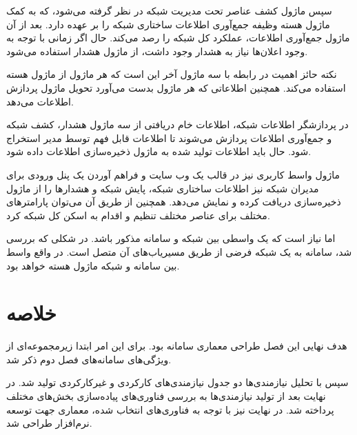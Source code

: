 سپس ماژول کشف عناصر تحت مدیریت شبکه در نظر گرفته می‌شود، که به کمک ماژول هسته وظیفه جمع‌آوری اطلاعات ساختاری شبکه را بر عهده دارد. بعد از آن ماژول جمع‌آوری اطلاعات، عملکرد کل شبکه را رصد می‌کند. حال اگر زمانی با توجه به وجود اعلان‌ها نیاز به هشدار وجود داشت، از ماژول هشدار استفاده می‌شود. 

\newpage

نکته حائز اهمیت در رابطه با سه ماژول آخر این است که هر ماژول از ماژول هسته استفاده می‌کند. همچنین اطلاعاتی که هر ماژول بدست می‌آورد تحویل ماژول پردازش اطلاعات می‌دهد.

در پردازشگر اطلاعات شبکه، اطلاعات خام دریافتی از سه ماژول هشدار، کشف شبکه و جمع‌آوری اطلاعات پردازش می‌شوند تا اطلاعات قابل فهم توسط مدیر استخراج شود. حال باید اطلاعات تولید شده به ماژول ذخیره‌سازی اطلاعات داده شود.

ماژول واسط کاربری نیز در قالب یک وب سایت و فراهم آوردن یک پنل ورودی برای مدیران شبکه نیز اطلاعات ساختاری شبکه، پایش شبکه و هشدارها را از ماژول ذخیره‌سازی دریافت کرده و نمایش می‌دهد. همچنین از طریق آن می‌توان پارامترهای مختلف برای عناصر مختلف تنظیم و اقدام به اسکن کل شبکه کرد.

اما نیاز است که یک واسطی بین شبکه و سامانه مذکور باشد. در شکلی که بررسی شد، سامانه به یک شبکه فرضی از طریق مسیریاب‌های آن متصل است. در واقع واسط بین سامانه و شبکه ماژول هسته  خواهد بود.






\section{خلاصه}


هدف نهایی این فصل طراحی معماری سامانه بود. برای این امر ابتدا زیرمجموعه‌ای از ویژگی‌های سامانه‌های فصل دوم ذکر شد.

سپس با تحلیل نیازمندی‌ها دو جدول نیازمندی‌های کارکردی و غیرکارکردی تولید شد. در نهایت بعد از تولید نیازمندی‌ها به بررسی فناوری‌های پیاده‌سازی بخش‌های مختلف پرداخته شد. در نهایت نیز با توجه به فناوری‌های انتخاب شده، معماری جهت توسعه نرم‌افزار طراحی شد.


